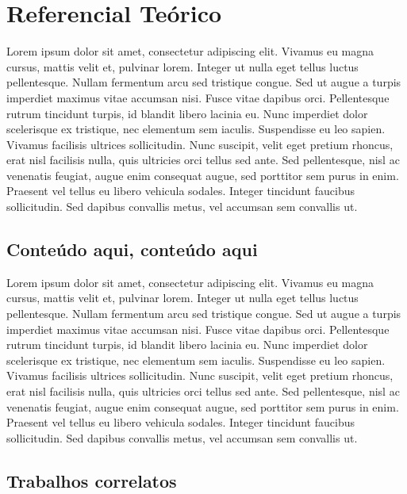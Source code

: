 \chapter{Referencial Teórico}
Lorem ipsum dolor sit amet, consectetur adipiscing elit. Vivamus eu magna cursus, mattis velit et\cite{iso_cut_test_1114}, pulvinar lorem. Integer ut nulla eget tellus luctus pellentesque. Nullam fermentum arcu sed tristique congue. Sed ut augue a turpis imperdiet maximus vitae accumsan nisi. Fusce vitae dapibus orci. Pellentesque rutrum tincidunt turpis, id blandit libero lacinia eu. Nunc imperdiet dolor scelerisque ex tristique, nec elementum sem iaculis. Suspendisse eu leo sapien. Vivamus facilisis ultrices sollicitudin. Nunc suscipit, velit eget pretium rhoncus\cite{cocoa_quality_requeriments_2016}, erat nisl facilisis nulla, quis ultricies orci tellus sed ante. Sed pellentesque, nisl ac venenatis feugiat, augue enim consequat augue, sed porttitor sem purus in enim. Praesent vel tellus eu libero vehicula sodales. Integer tincidunt faucibus sollicitudin. Sed dapibus convallis metus, vel accumsan sem convallis ut.


\section{Conteúdo aqui, conteúdo aqui}
Lorem ipsum dolor sit amet, consectetur adipiscing elit. Vivamus eu magna cursus, mattis velit et, pulvinar lorem. Integer ut nulla eget tellus luctus pellentesque. Nullam fermentum arcu sed tristique congue. Sed ut augue a turpis imperdiet maximus vitae accumsan nisi. Fusce vitae dapibus orci. Pellentesque rutrum tincidunt turpis, id blandit libero lacinia eu. Nunc imperdiet dolor scelerisque ex tristique, nec elementum sem iaculis. Suspendisse eu leo sapien. Vivamus facilisis ultrices sollicitudin. Nunc suscipit, velit eget pretium rhoncus, erat nisl facilisis nulla, quis ultricies orci tellus sed ante. Sed pellentesque, nisl ac venenatis feugiat, augue enim consequat augue, sed porttitor sem purus in enim. Praesent vel tellus eu libero vehicula sodales. Integer tincidunt faucibus sollicitudin. Sed dapibus convallis metus, vel accumsan sem convallis ut.

\section{Trabalhos correlatos}
\label{sec:trabalhos_correlatos}

